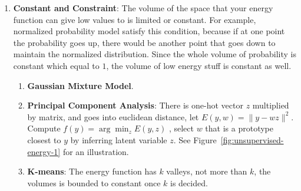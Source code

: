 \begin{enumerate}
    \item \textbf{Constant and Constraint}: The volume of the space that your energy function can give low values to is limited or constant. For example, normalized probability model satisfy this condition, because if at one point the probability goes up, there would be another point that goes down to maintain the normalized distribution. Since the whole volume of probability is constant which equal to $1$, the volume of low energy stuff is constant as well.
    \begin{enumerate}
        \item \textbf{Gaussian Mixture Model}.
        \item \textbf{Principal Component Analysis}: There is one-hot vector $z$ multiplied by matrix, and goes into euclidean distance, let $E(y, w)= \|y-wz \|^2$. Compute $f(y)= \arg\min_z E(y,z)$ , select $w$ that is a prototype closest to $y$ by inferring latent variable $z$. See Figure~\ref{fig:unsupervised-energy-1} for an illustration.
        \item \textbf{K-means}: The energy function has $k$ valleys, not more than $k$, the volumes is bounded to constant once $k$ is decided.
    \end{enumerate}
    

\end{enumerate}
